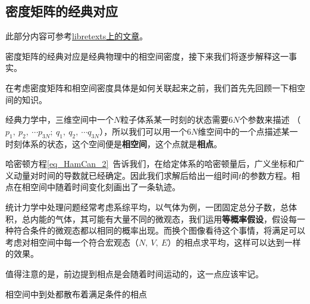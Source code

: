 \subsection{密度矩阵的经典对应}

此部分内容可参考\href{https://chem.libretexts.org/Bookshelves/Physical_and_Theoretical_Chemistry_Textbook_Maps/Supplemental_Modules_(Physical_and_Theoretical_Chemistry)/Statistical_Mechanics/Fundamentals_of_Statistical_Mechanics/09._Classical_and_quantum_dynamics_of_density_matrices}{libretexts上的文章}。

密度矩阵的经典对应是经典物理中的相空间密度，接下来我们将逐步解释这一事实。

在考虑密度矩阵和相空间密度具体是如何关联起来之前，我们首先先回顾一下相空间的知识。

经典力学中，三维空间中一个$N$粒子体系某一时刻的状态需要$6N$个参数来描述 （$p_1,~p_2,~\cdots p_{3N};~q_1,~q_2,~\cdots q_{3N}$），所以我们可以用一个$6N$维空间中的一个点描述某一时刻体系的状态，这个空间便是\textbf{相空间}，这个点就是\textbf{相点}。

哈密顿方程\autoref{eq_HamCan_2}~告诉我们，在给定体系的哈密顿量后，广义坐标和广义动量对时间的导数就已经确定。因此我们求解后给出一组时间$t$的参数方程。相点在相空间中随着时间变化刻画出了一条轨迹。

统计力学中处理问题经常考虑系综平均，以气体为例，一团固定总分子数，总体积，总内能的气体，其可能有大量不同的微观态，我们运用\textbf{等概率假设}，假设每一种符合条件的微观态都以相同的概率出现。而换个图像看待这个事情，将满足可以考虑对相空间中每一个符合宏观态（$N,~V,~E$）的相点求平均，这样可以达到一样的效果。

值得注意的是，前边提到相点是会随着时间运动的，这一点应该牢记。

相空间中到处都散布着满足条件的相点



